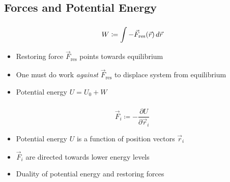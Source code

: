 \subsection{Forces and Potential Energy}
\label{subsect:forces-and-potential-energy}

\begin{frame}
  \frametitle{\insertsubsection}
  \begin{equation}
    W \coloneqq \int -\vec{F}_\text{res}(\vec{r}) \mathop{d \vec{r}}
  \end{equation}
  \begin{itemize}
    \item Restoring force ${\vec{F}_\text{res}}$ points towards equilibrium
    \item One must do work \emph{against} ${\vec{F}_\text{res}}$ to displace system from equilibrium
    \item Potential energy ${U = U_0 + W}$
  \end{itemize}
\end{frame}


\begin{frame}
  \frametitle{\insertsubsection}
  \begin{equation}
    \vec{F}_i \coloneqq -\frac{\partial U}{\partial \vec{r}_i}
    \label{eqn:force-as-differential}
  \end{equation}
  \begin{itemize}
    \item Potential energy ${U}$ is a function of position vectors ${\vec{r}_i}$
    \item ${\vec{F}_i}$ are directed towards lower energy levels
    \item Duality of potential energy and restoring forces
  \end{itemize}
\end{frame}
